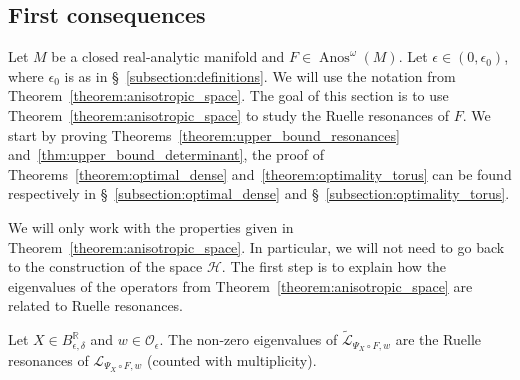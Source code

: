 \documentclass[10pt]{amsart}
\theoremstyle{definition}\newtheorem{defi}[theo]{Definition}\newtheorem{rema}[theo]{Remark}\newtheorem{exam}[theo]{Example}\newtheorem{exem}[theo]{Example}\newtheorem{nota}[theo]{Notation}
\DeclareMathOperator{\Anos}{Anos}
\newcommand{\clO}{\mathcal{O}}
\newcommand{\clL}{\mathcal{L}}
\newcommand{\clH}{\mathcal{H}}
\newcommand{\bbR}{\mathbb{R}}
\begin{document}
\subsection{First consequences}

Let $M$ be a closed real-analytic manifold and $F \in \Anos^\omega(M)$. Let $\epsilon \in (0,\epsilon_0)$, where $\epsilon_0$ is as in \S~\ref{subsection:definitions}. We will use the notation from Theorem~\ref{theorem:anisotropic_space}. The goal of this section is to use Theorem~\ref{theorem:anisotropic_space} to study the Ruelle resonances of $F$. We start by proving Theorems~\ref{theorem:upper_bound_resonances} and~\ref{thm:upper_bound_determinant}, the proof of Theorems~\ref{theorem:optimal_dense} and~\ref{theorem:optimality_torus} can be found respectively in \S~\ref{subsection:optimal_dense} and \S~\ref{subsection:optimality_torus}.

We will only work with the properties given in Theorem~\ref{theorem:anisotropic_space}. In particular, we will not need to go back to the construction of the space $\clH$. The first step is to explain how the eigenvalues of the operators from Theorem~\ref{theorem:anisotropic_space} are related to Ruelle resonances.

\begin{prop}\label{proposition:determnation_spectrum}
Let $X \in B_{\epsilon,\delta}^{\bbR}$ and $w \in \clO_\epsilon$. The non-zero eigenvalues of $\widetilde{\clL}_{\Psi_X \circ F,w}$ are the Ruelle resonances of $\clL_{\Psi_X \circ F,w}$ (counted with multiplicity).
\end{prop}
\end{document}
